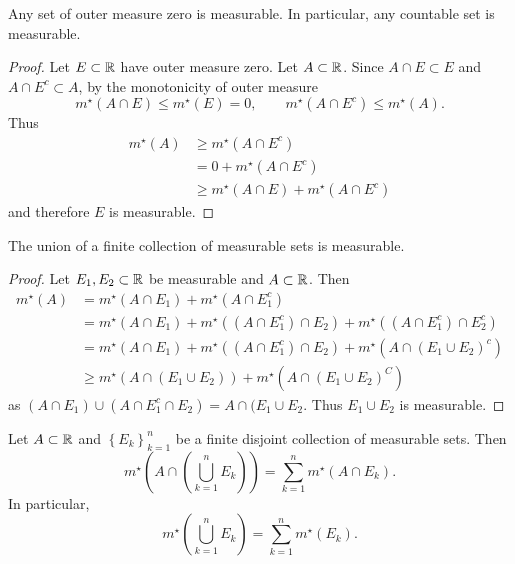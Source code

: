 
\begin{proposition}[]
	Any set of outer measure zero is measurable.
	In particular, any countable set is measurable.
\end{proposition}

\begin{proof}
	Let $E \subset \mathbb{R}$ have outer measure zero.
	Let $A \subset \mathbb{R}$.
	Since $A \cap E \subset E$ and
	$A \cap E^c \subset A$, by the monotonicity of outer measure
	\[
		m^\star(A \cap E) \leq m^\star(E) = 0, \qquad
		m^\star(A \cap E^c) \leq m^\star(A).
	\]
	Thus
	\begin{align*}
		m^\star(A)
		&\geq m^\star(A \cap E^c) \\
		&= 0 + m^\star(A \cap E^c) \\
		&\geq m^\star(A \cap E) + m^\star(A \cap E^c)
	\end{align*}
	and therefore $E$ is measurable.
\end{proof}

\begin{proposition}[]
	The union of a finite collection of measurable sets is measurable.
\end{proposition}

\begin{proof}
	Let $E_1, E_2 \subset \mathbb{R}$ be measurable and $A \subset \mathbb{R}$.
	Then
	\begin{align*}
		m^\star(A)
		&= m^\star(A \cap E_1) + m^\star(A \cap E_1^c) \\
		&= m^\star(A \cap E_1) + m^\star((A \cap E_1^c) \cap E_2)
			+ m^\star((A \cap E_1^c) \cap E_2^c) \\
		&= m^\star(A \cap E_1) + m^\star((A \cap E_1^c) \cap E_2)
			+ m^\star(A \cap (E_1 \cup E_2)^c) \\
		&\geq m^\star(A \cap (E_1 \cup E_2)) + m^\star(A \cap (E_1 \cup E_2)^C)
	\end{align*}
	as $(A \cap E_1) \cup (A \cap E_1^c \cap E_2) = A \cap (E_1 \cup E_2$.
	Thus $E_1 \cup E_2$ is measurable.
\end{proof}

\begin{proposition}[]
	Let $A \subset \mathbb{R}$ and $
		\left\{
			E_k
		\right\}_{k=1}^n
		$ be a finite disjoint collection of measurable sets.
		Then
		\[
			m^\star\left( 
				A \cap \left( 
					\bigcup_{k=1}^n E_k 
				\right) 
			\right) = \sum^{n}_{k=1} m^\star(A \cap E_k).
		\]
		In particular,
		\[
			m^\star\left( 
				\bigcup_{k=1}^n E_k 
			\right) = \sum^{n}_{k=1} m^\star(E_k).
		\]
\end{proposition}

